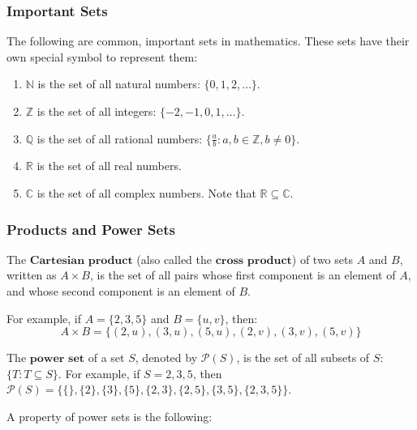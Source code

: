 \documentclass[openany]{book}
\begin{document}
\subsubsection{Important Sets} The following are common, important sets in mathematics. These sets have their own special symbol to represent them:
\begin{enumerate}
	\item $\mathbb{N}$ is the set of all natural numbers: $\{0, 1, 2, \ldots\}$.
	\item $\mathbb{Z}$ is the set of all integers: $\{-2,-1,0,1,\ldots\}$.
	\item $\mathbb{Q}$ is the set of all rational numbers: $\{\frac{a}{b}:a,b\in\mathbb{Z},b\neq 0\}$.
	\item $\mathbb{R}$ is the set of all real numbers.
	\item $\mathbb{C}$ is the set of all complex numbers. Note that $\mathbb{R}\subseteq\mathbb{C}$.
\end{enumerate}

\subsubsection{Products and Power Sets}
\begin{defn}
	The $\textbf{Cartesian product}$ (also called the $\textbf{cross product}$) of two sets $A$ and $B$, written as $A\times B$, is the set of all pairs whose first component is an element of $A$, and whose second component is an element of $B$.
\end{defn}
\begin{example}
	 For example, if $A=\{2,3,5\}$ and $B=\{u,v\}$, then:
	 \begin{equation*}
	 	A\times B=\{(2,u),(3,u),(5,u),(2,v),(3,v),(5,v)\}
	 \end{equation*} 
\end{example}

\begin{defn}
	The $\textbf{power set}$ of a set $S$, denoted by $\mathscr{P}(S)$, is the set of all subsets of $S$: $\{T:T\subseteq S\}$. For example, if $S={2,3,5}$, then $\mathscr{P}(S)=\{\{\}, \{2\}, \{3\}, \{5\}, \{2,3\}, \{2,5\}, \{3,5\}, \{2,3,5\}\}$.
\end{defn}

A property of power sets is the following: 
\end{document}
